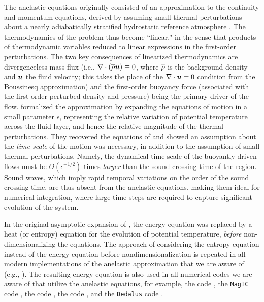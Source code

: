 \documentclass[12pt]{article}
\begin{document}
	The anelastic equations originally consisted of an approximation to the continuity and momentum equations, derived by assuming small thermal perturbations about a nearly adiabatically stratified hydrostatic reference atmosphere \citep{Batchelor1953,Charney1960}. The thermodynamics of the problem thus become ``linear," in the sense that products of thermodynamic variables reduced to linear expressions in the first-order perturbations. The two key consequences of linearized thermodynamics are divergenceless mass flux (i.e., $\nabla\cdot(\overline{\rho}\bm{u})\equiv0$, where $\overline{\rho}$ is the background density and $\bm{u}$ the fluid velocity; this takes the place of the $\nabla\cdot\bm{u}=0$ condition from the Boussinesq approximation) and the first-order buoyancy force (associated with the first-order perturbed density and pressure) being the primary driver of the flow. \citep{Ogura1962} formalized the approximation by expanding the equations of motion in a small parameter $\epsilon$, representing the relative variation of potential temperature across the fluid layer, and hence the relative magnitude of the thermal perturbations. They recovered the equations of \citet{Batchelor1953,Charney1960} and showed an assumption about the \textit{time scale} of the motion was necessary, in addition to the assumption of small thermal perturbations. Namely, the dynamical time scale of the buoyantly driven flows must be $O(\epsilon^{-1/2})$ times \textit{larger} than the sound crossing time of the region. Sound waves, which imply rapid temporal variations on the order of the sound crossing time, are thus absent from the anelastic equations, making them ideal for numerical integration, where large time steps are required to capture significant evolution of the system. 
	
	In the original asymptotic expansion of \citet{Ogura1962}, the energy equation was replaced by a heat (or entropy) equation for the evolution of potential temperature, \textit{before} non-dimensionalizing the equations. The approach of considering the entropy equation instead of the energy equation before nondimensionalization is repeated in all modern implementations of the anelastic approximation that we are aware of (e.g., \citealt{Gilman1981,Lipps1982,Glatzmaier1984,Lantz1992,Braginsky1995,Lantz1999,Clune1999,Rogers2005,Brown2012,Vasil2013,Wilczyski2022}). The resulting energy equation is also used in all numerical codes we are aware of that utilize the anelastic equations, for example, the {\ash} code \citep{Brun2004}, the \texttt{MagIC} code \citep{Gastine2012}, the {\rayleigh} code \citep{Featherstone2016a,Featherstone2023}, the {\eulag} code \citep{Smolarkiewicz2004}, and the \texttt{Dedalus} code \citep{Burns2020,Brown2020}. 
	
\end{document}
